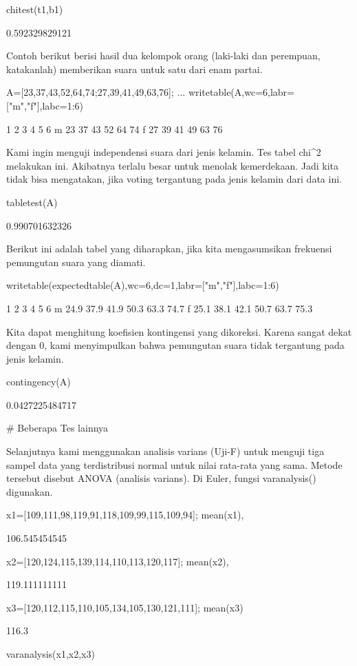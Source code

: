 \documentclass{article}
\begin{document}
\>chitest(t1,b1)


    0.592329829121

Contoh berikut berisi hasil dua kelompok orang (laki-laki dan
perempuan, katakanlah) memberikan suara untuk satu dari enam partai.


\>A=[23,37,43,52,64,74;27,39,41,49,63,76];  ...  
\>     writetable(A,wc=6,labr=["m","f"],labc=1:6)


               1     2     3     4     5     6
         m    23    37    43    52    64    74
         f    27    39    41    49    63    76

Kami ingin menguji independensi suara dari jenis kelamin. Tes tabel
chi^2 melakukan ini. Akibatnya terlalu besar untuk menolak
kemerdekaan. Jadi kita tidak bisa mengatakan, jika voting tergantung
pada jenis kelamin dari data ini.


\>tabletest(A)


    0.990701632326

Berikut ini adalah tabel yang diharapkan, jika kita mengasumsikan
frekuensi pemungutan suara yang diamati.


\>writetable(expectedtable(A),wc=6,dc=1,labr=["m","f"],labc=1:6)


               1     2     3     4     5     6
         m  24.9  37.9  41.9  50.3  63.3  74.7
         f  25.1  38.1  42.1  50.7  63.7  75.3

Kita dapat menghitung koefisien kontingensi yang dikoreksi. Karena
sangat dekat dengan 0, kami menyimpulkan bahwa pemungutan suara tidak
tergantung pada jenis kelamin.


\>contingency(A)


    0.0427225484717

# Beberapa Tes lainnya

Selanjutnya kami menggunakan analisis varians (Uji-F) untuk menguji
tiga sampel data yang terdistribusi normal untuk nilai rata-rata yang
sama. Metode tersebut disebut ANOVA (analisis varians). Di Euler,
fungsi varanalysis() digunakan.


\>x1=[109,111,98,119,91,118,109,99,115,109,94]; mean(x1),


    106.545454545

\>x2=[120,124,115,139,114,110,113,120,117]; mean(x2),


    119.111111111

\>x3=[120,112,115,110,105,134,105,130,121,111]; mean(x3)


    116.3

\>varanalysis(x1,x2,x3)
\end{document}
